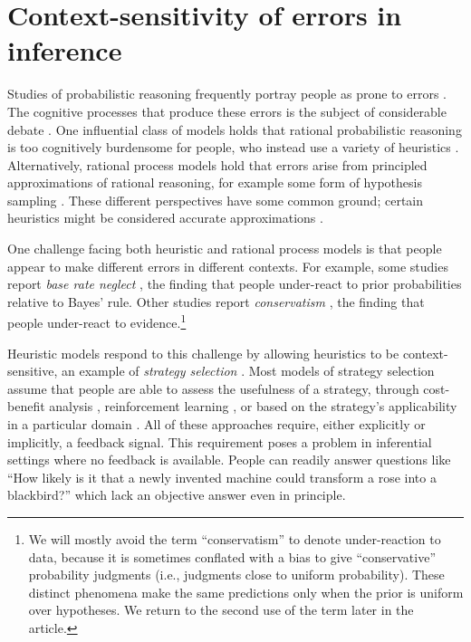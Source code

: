 \section{Context-sensitivity of errors in inference}

Studies of probabilistic reasoning frequently portray people as prone to errors \citep{tversky1974judgment,slovic1971comparison,grether1980bayes,fischhoff1983hypothesis}. The cognitive processes that produce these errors is the subject of considerable debate \citep{mellers2001frequency,gigerenzer1996narrow,samuels2012ending}. One influential class of models holds that rational probabilistic reasoning is too cognitively burdensome for people, who instead use a variety of heuristics \citep{tversky1974judgment,gigerenzer1996reasoning,shah2008heuristics}. Alternatively, rational process models hold that errors arise from principled approximations of rational reasoning, for example some form of hypothesis sampling \citep{dasgupta2017hypotheses,sanborn2016bayesian,griffiths2012bridging}. These different perspectives have some common ground; certain heuristics might be considered accurate approximations \citep{gigerenzer2009homo,parpart2018heuristics,belousov2016catching}.

One challenge facing both heuristic and rational process models is that people appear to make different errors in different contexts. For example, some studies report \emph{base rate neglect} \citep{bar1980base,birnbaum1983base,grether1980bayes,kahneman1973psychology}, the finding that people under-react to prior probabilities relative to Bayes' rule. Other studies report \emph{conservatism} \citep{phillips1966conservatism, peterson1965sensitivity}, the finding that people under-react to evidence.\footnote{We will mostly avoid the term ``conservatism'' to denote under-reaction to data, because it is sometimes conflated with a bias to give ``conservative'' probability judgments (i.e., judgments close to uniform probability). These distinct phenomena make the same predictions only when the prior is uniform over hypotheses. We return to the second use of the term later in the article.}

Heuristic models respond to this challenge by allowing heuristics to be context-sensitive, an example of \emph{strategy selection} \citep{gigerenzer2008heuristics,marewski2014strategy}. Most models of strategy selection assume that people are able to assess the usefulness of a strategy, through cost-benefit analysis \citep{johnson85,beach1978contingency,lieder2017strategy}, reinforcement learning \citep{erev05,rieskamp06}, or based on the strategy's applicability in a particular domain \citep{marewski2011cognitive,schulz2016simple}. All of these approaches require, either explicitly or implicitly, a feedback signal. This requirement poses a problem in inferential settings where no feedback is available. People can readily answer questions like ``How likely is it that a newly invented machine could transform a rose into a blackbird?'' \citep{Griffiths15} which lack an objective answer even in principle.  


